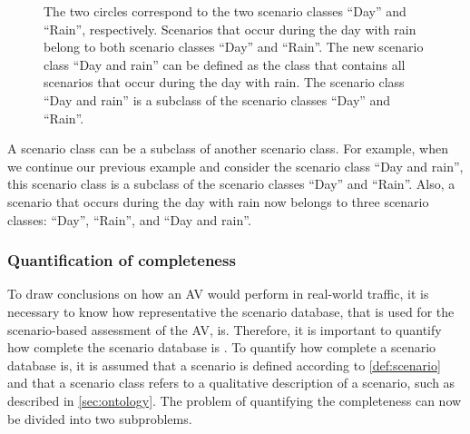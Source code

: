\setlength{\venncircle}{10em}
\begin{figure}
	\centering
	\caption{The two circles correspond to the two scenario classes ``Day'' and ``Rain'', respectively. Scenarios that occur during the day with rain belong to both scenario classes ``Day'' and ``Rain''. The new scenario class ``Day and rain'' can be defined as the class that contains all scenarios that occur during the day with rain. The scenario class ``Day and rain'' is a subclass of the scenario classes ``Day'' and ``Rain''.}
	\label{fig:venn diagram scenario class}
\end{figure}

A scenario class can be a subclass of another scenario class. For example, when we continue our previous example and consider the scenario class ``Day and rain'', this scenario class is a subclass of the scenario classes ``Day'' and ``Rain''. Also, a scenario that occurs during the day with rain now belongs to three scenario classes: ``Day'', ``Rain'', and ``Day and rain''.

\subsubsection{Quantification of completeness}

To draw conclusions on how an AV would perform in real-world traffic, it is necessary to know how representative the scenario database, that is used for the scenario-based assessment of the AV, is. Therefore, it is important to quantify how complete the scenario database is \cite{geyer2014, alvarez2017prospective, stellet2015taxonomy}. To quantify how complete a scenario database is, it is assumed that a scenario is defined according to \cref{def:scenario} and that a scenario class refers to a qualitative description of a scenario, such as described in \cref{sec:ontology}. The problem of quantifying the completeness can now be divided into two subproblems.

